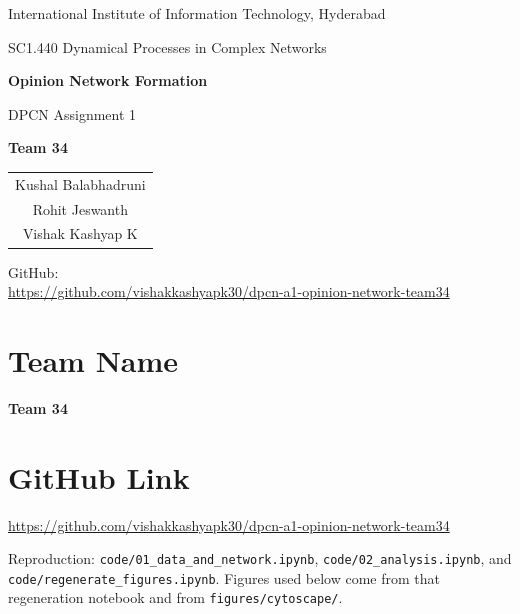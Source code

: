 \documentclass[10pt]{article}
\begin{document}
\begin{titlepage}
\thispagestyle{empty}
\centering
\vspace*{2.2cm}
{\LARGE International Institute of Information Technology, Hyderabad\par}
\vspace{0.35cm}
{\large SC1.440 Dynamical Processes in Complex Networks\par}
\vspace{1.6cm}
{\Huge\bfseries Opinion Network Formation\par}
\vspace{0.45cm}
{\Large DPCN Assignment 1\par}
\vspace{1.8cm}
{\large\textbf{Team 34}\par}
\vspace{0.9cm}
\begin{tabular}{c}
Kushal Balabhadruni \\[0.35em]
Rohit Jeswanth \\[0.35em]
Vishak Kashyap K
\end{tabular}
\vfill
{\large GitHub:\\
\url{https://github.com/vishakkashyapk30/dpcn-a1-opinion-network-team34}\par}
\vspace{1.2cm}
\end{titlepage}

\newpage
\thispagestyle{empty}
\tableofcontents
\newpage
{}
\setcounter{page}{1}

\section{Team Name}
\textbf{Team 34}

\section{GitHub Link}
\url{https://github.com/vishakkashyapk30/dpcn-a1-opinion-network-team34}

Reproduction: \texttt{code/01\_data\_and\_network.ipynb},
\texttt{code/02\_analysis.ipynb}, and \texttt{code/regenerate\_figures.ipynb}.
Figures used below come from that regeneration notebook and from
\texttt{figures/cytoscape/}.
\end{document}
